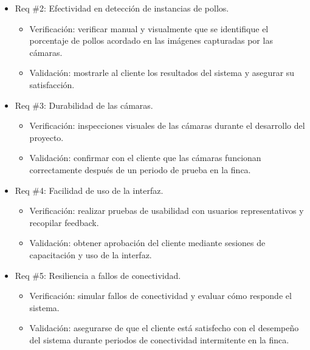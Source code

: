 \documentclass[
11pt, %
]{charter}
\begin{document}
\begin{itemize} 
\item Req \#2: Efectividad en detección de instancias de pollos.
	\begin{itemize}
	\item Verificación: verificar manual y visualmente que se identifique el porcentaje de pollos acordado en las imágenes capturadas por las cámaras.
	\item Validación: mostrarle al cliente los resultados del sistema y asegurar su satisfacción.
	\end{itemize}
\end{itemize}

\begin{itemize} 
\item Req \#3: Durabilidad de las cámaras.
	\begin{itemize}
	\item Verificación: inspecciones visuales de las cámaras durante el desarrollo del proyecto.
	\item Validación: confirmar con el cliente que las cámaras funcionan correctamente después de un periodo de prueba en la finca.
	\end{itemize}
\end{itemize}

\begin{itemize} 
\item Req \#4: Facilidad de uso de la interfaz.
	\begin{itemize}
	\item Verificación: realizar pruebas de usabilidad con usuarios representativos y recopilar feedback.
	\item Validación: obtener aprobación del cliente mediante sesiones de capacitación y uso de la interfaz.
	\end{itemize}
\end{itemize}

\begin{itemize} 
\item Req \#5: Resiliencia a fallos de conectividad.
	\begin{itemize}
	\item Verificación: simular fallos de conectividad y evaluar cómo responde el sistema.
	\item Validación: asegurarse de que el cliente está satisfecho con el desempeño del sistema durante periodos de conectividad intermitente en la finca.
	\end{itemize}
\end{itemize}
\end{document}
